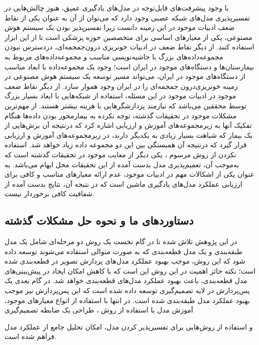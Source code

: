  
 
 
 با وجود پیشرفت‌های قابل‌توجه در مدل‌های یادگیری عمیق، هنوز چالش‌هایی در تفسیرپذیری مدل‌های شبکه عصبی وجود دارد که می‌توان از آن به عنوان یکی از نقاط ضعف ادبیات موجود در این زمینه دانست زیرا تفسیرپذیر بودن یک سیستم هوش مصنوعی، یکی از معیارهای اساسی برای متخصصین حوزه پزشکی است تا از این ابزار استفاده کنند. از دیگر نقاط ضعف در ادبیات خونریزی درون‌جمجمه‌ای، دردسترس نبودن مجموعه‌داده‌های بزرگ با حاشیه‌نویسی مناسب و مجموعه‌داده‌های مربوط به بیمارستان‌ها و دستگاه‌های موجود در ایران است؛ وجود یک مجموعه‌داده با ابعاد مناسب از دستگاه‌های موجود در ایران، می‌تواند مسیر توسعه یک سیستم هوش مصنوعی در زمینه خونریزی‌درون جمجمه‌ای را در ایران وجود هموار سازد. از دیگر نقاط ضعف موجود در ادبیات موجود در این مسئله، استفاده از شبکه‌هایی با ابعاد بسیار بزرگ توسط محققین می‌باشد که نیازمند پردازشگر‌هایی با هزینه بیشتر هستند. از مهم‌ترین مشکلات موجود در تحقیقات گذشته، توجه نکرده به بیمارمحور بودن داده‌ها هنگام تفکیک آنها به زیرمجموعه‌های آموزش و ارزیابی اشاره کرد که درنتیجه‌ آن برش‌هایی از یک بیمار که شباهت بسیار زیادی به یکدیگر دارند، در زیرمجموعه‌های آموزش و ارزیابی قرار گیرد که درنتیجه آن همبستگی بین این دو مجموعه داده زیاد خواهد شد.
استفاده نکردن از روش مرسوم
، 
یکی دیگر از معایب موجود در تحقیقات گذشته است که به‌موجب آن، تعمیم‌پذیری مدل بدست آمده از این تحقیقات محل ابهام می‌باشد.
به عنوان یکی از اشکالات مهم در ادبیات موجود، عدم ارائه معیارهای مناسب و کافی برای ارزیابی عملکرد مدل‌های یادگیری ماشین است که در نتیجه آن، نتایج بدست آمده از شفافیت کافی برخوردار نیست.
 \subsection{دستاوردهای ما و نحوه حل مشکلات گذشته}
 در این پژوهش تلاش شده تا در گام نخست یک روش دو مرحله‌ای شامل یک مدل طبقه‌بندی و یک مدل قطعه‌بندی که به صورت متوالی استفاده می‌شوند توسعه داده شود که این روش،  موجب بهبود عملکرد مدل‌های پردازش تصویر در قطعه‌بندی شده است؛ نکته حائز اهمیت در این روش این است که با کاهش امکان ایجاد 
 در پیش‌بینی‌های مدل قطعه‌بندی، باعث بهبود عملکرد مدل‌های قطعه‌بندی خواهد شد.
  در گام بعدی یک پس‌پردازش
  در لایه تصمیم‌گیری توسعه داده شده است که این پس‌پردازش نیز موجب بهبود عملکرد مدل طبقه‌بندی شده است.
 در انتها با استفاده از انواع معیارهای موجود، آموزش مدل با استفاده از روش
 ،
  طراحی یک ضابطه تصمیم‌گیری
 
  و استفاده از روش‌هایی برای تفسیر‌پذیر کردن مدل، امکان تحلیل جامع از عملکرد مدل فراهم شده است.
